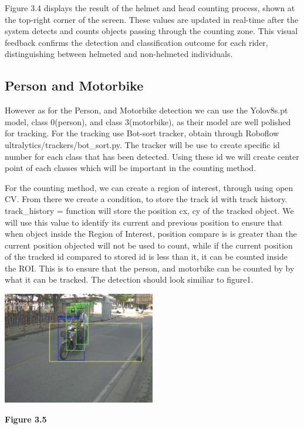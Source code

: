 \noindent\hspace{2.5em}Figure 3.4 displays the result of the helmet and head counting process, shown at the top-right corner of the screen. These values are updated in real-time after the system detects and counts objects passing through the counting zone. This visual feedback confirms the detection and classification outcome for each rider, distinguishing between helmeted and non-helmeted individuals.




\subsection{Person and Motorbike}
\noindent\hspace{2.5em}However as for the Person, and Motorbike detection we can use the Yolov8s.pt model, class 0(person), and class 3(motorbike), as their model are well polished for tracking. For the tracking use Bot-sort tracker, obtain through Roboflow ultralytics/trackers/bot\_sort.py. The tracker will be use to create specific id number for each class that has been detected. Using these id we will create center point of each classes which will be important in the counting method.


\noindent\hspace{2.5em}For the counting method, we can create a region of interest, through using open CV. From there we create a condition, to store the track id with track history. track\_history = {}   function will store the position cx, cy of the tracked object. We will use this value to identify its current and previous position to ensure that when object inside the Region of Interest, position compare is is greater than the current position objected will not be used to count, while if the current position of the tracked id compared to stored id is less than it, it can be counted inside the ROI. This is to ensure that the person, and motorbike can be counted by by what it can be tracked. The detection should look similiar to figure1.

\begin{center}
	\includegraphics[width=0.5\textwidth]{fig1.png}
	
	\vspace{0.5em}
	\textbf{Figure 3.5}
\end{center}



